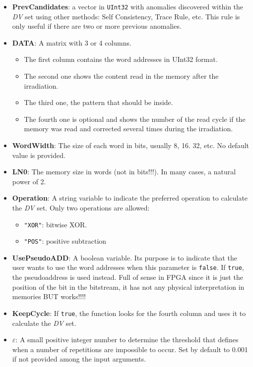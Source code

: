 \begin{itemize}
\begin{itemize}
	 	\item \textbf{PrevCandidates}: a vector in \texttt{UInt32} with anomalies discovered within the \textit{DV} set using other methods: Self Consistency, Trace Rule, etc. This rule is only useful if there are two or more previous anomalies. 
	 	
	 	\item   \textbf{DATA}: A matrix with 3 or 4 columns. 
	 	\begin{itemize}
	 		\item The first column contains the word addresses in UInt32 format.
	 		\item The second one shows the content read in the memory after the irradiation.
	 		\item The third one, the pattern that should be inside.
	 		\item  The fourth one is optional and shows the number of the read cycle if the   memory was read and corrected several times during the irradiation.
	 	\end{itemize}
	 	\item   \textbf{WordWidth}: The size of each word in bits, usually 8, 16. 32, etc. No default value is provided.
	 	\item   \textbf{LN0}: The memory size in words (not in bits!!!). In many cases, a natural power of 2.
	 	\item   \textbf{Operation}: A string variable to indicate the preferred operation to calculate
	 	the \textit{DV} set. Only two operations are allowed: 
	 	\begin{itemize}
	 		\item \texttt{"XOR"}: bitwise XOR.
	 		\item\texttt{"POS"}: positive subtraction
	 	\end{itemize}
	 	\item  \textbf{UsePseudoADD}: A boolean variable. Its purpose is to indicate that the user wants to use the word addresses when this parameter is \texttt{false}. If \texttt{true}, the pseudoaddress  is used instead. Full of sense in FPGA since it is just the position  of the bit in the bitstream, it has not any physical interpretation in memories BUT works!!!!
	 	\item   \textbf{KeepCycle}: If \texttt{true}, the function looks for the fourth column and uses it to calculate the \textit{DV} set.
	 	\item   \textbf{\(\varepsilon\)}: A small positive integer number to determine the threshold that defines when a number of repetitions are impossible to occur. Set by default to 0.001 if not provided among the input arguments.
	 \end{itemize}
	 

\end{itemize}
